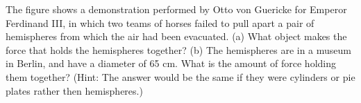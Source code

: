 The figure shows a demonstration performed by Otto von Guericke for Emperor Ferdinand III,
in which two teams of horses failed to pull apart a pair of hemispheres from which the
air had been evacuated. (a) What object makes the force that holds the hemispheres together?
(b) The hemispheres are in a museum in Berlin, and have a diameter of 65 cm. What is the
amount of force holding them together? (Hint: The answer would be the same if they were
cylinders or pie plates rather then hemispheres.)
